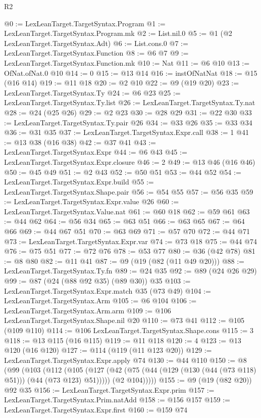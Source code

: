 \begin{lexlean}{R2}
\begin{coremodule}
{{{{{{{@0 := LexLeanTarget.TargetSyntax.Program
@1 := LexLeanTarget.TargetSyntax.Program.mk
@2 := List.nil.{0}
@5 := @1 (@2 LexLeanTarget.TargetSyntax.Adt)
@6 := List.cons.{0}
@7 := LexLeanTarget.TargetSyntax.Function
@8 := @6 @7
@9 := LexLeanTarget.TargetSyntax.Function.mk
@10 := Nat
@11 := @6 @10
@13 := OfNat.ofNat.{0} @10
@14 := 0
@15 := @13 @14
@16 := instOfNatNat
@18 := @15 (@16 @14)
@19 := @11 @18
@20 := @2 @10
@22 := @9 (@19 @20)
@23 := LexLeanTarget.TargetSyntax.Ty
@24 := @6 @23
@25 := LexLeanTarget.TargetSyntax.Ty.list
@26 := LexLeanTarget.TargetSyntax.Ty.nat
@28 := @24 (@25 @26)
@29 := @2 @23
@30 := @28 @29
@31 := @22 @30
@33 := LexLeanTarget.TargetSyntax.Ty.pair @26
@34 := @33 @26
@35 := @33 @34
@36 := @31 @35
@37 := LexLeanTarget.TargetSyntax.Expr.call
@38 := 1
@41 := @13 @38 (@16 @38)
@42 := @37 @41
@43 := LexLeanTarget.TargetSyntax.Expr
@44 := @6 @43
@45 := LexLeanTarget.TargetSyntax.Expr.closure
@46 := 2
@49 := @13 @46 (@16 @46)
@50 := @45 @49
@51 := @2 @43
@52 := @50 @51
@53 := @44 @52
@54 := LexLeanTarget.TargetSyntax.Expr.build
@55 := LexLeanTarget.TargetSyntax.Shape.pair
@56 := @54 @55
@57 := @56 @35
@59 := LexLeanTarget.TargetSyntax.Expr.value @26
@60 := LexLeanTarget.TargetSyntax.Value.nat
@61 := @60 @18
@62 := @59 @61
@63 := @44 @62
@64 := @56 @34
@65 := @63 @51
@66 := @63 @65
@67 := @64 @66
@69 := @44 @67 @51
@70 := @63 @69
@71 := @57 @70
@72 := @44 @71
@73 := LexLeanTarget.TargetSyntax.Expr.var
@74 := @73 @18
@75 := @44 @74
@76 := @75 @51
@77 := @72 @76
@78 := @53 @77
@80 := @36 (@42 @78)
@81 := @8 @80
@82 := @11 @41
@87 := @9 (@19 (@82 (@11 @49 @20)))
@88 := LexLeanTarget.TargetSyntax.Ty.fn
@89 := @24 @35
@92 := @89 (@24 @26 @29)
@99 := @87 (@24 (@88 @92 @35) (@89 @30)) @35
@103 := LexLeanTarget.TargetSyntax.Expr.match @35 (@73 @49)
@104 := LexLeanTarget.TargetSyntax.Arm
@105 := @6 @104
@106 := LexLeanTarget.TargetSyntax.Arm.arm
@109 := @106 LexLeanTarget.TargetSyntax.Shape.nil @20
@110 := @73 @41
@112 := @105 (@109 @110)
@114 := @106 LexLeanTarget.TargetSyntax.Shape.cons
@115 := 3
@118 := @13 @115 (@16 @115)
@119 := @11 @118
@120 := 4
@123 := @13 @120 (@16 @120)
@127 := @114 (@119 (@11 @123 @20))
@129 := LexLeanTarget.TargetSyntax.Expr.apply @74
@130 := @44 @110
@150 := @8
    (@99
      (@103
        (@112
          (@105
            (@127 (@42 (@75 (@44 (@129 (@130 (@44 (@73 @118) @51))) (@44 (@73 @123) @51)))))
            (@2 @104)))))
@155 := @9 (@19 (@82 @20)) @92 @35
@156 := LexLeanTarget.TargetSyntax.Expr.prim
@157 := LexLeanTarget.TargetSyntax.Prim.natAdd
@158 := @156 @157
@159 := LexLeanTarget.TargetSyntax.Expr.first
@160 := @159 @74
}}}}}}}
\end{coremodule}
\end{lexlean}
